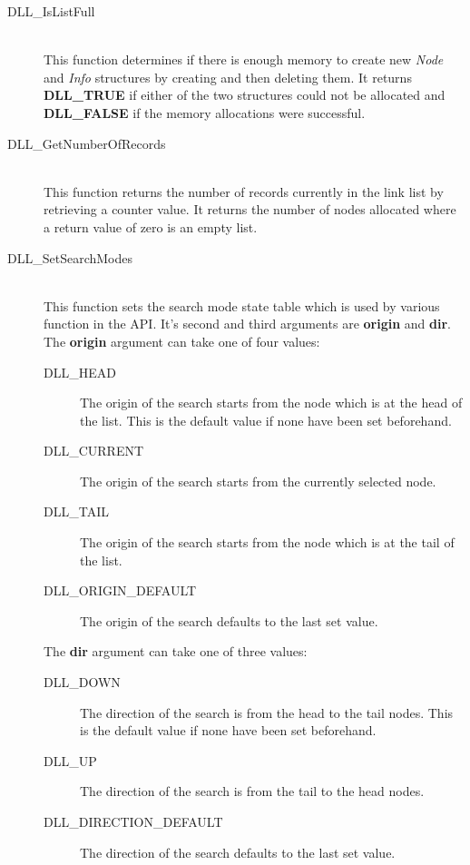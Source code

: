 \documentclass[10pt,letterpaper,titlepage]{article}
\begin{document}
\begin{description}
\begin{description}
 \item[DLL\_IsListFull]\quad\\
 This function determines if there is enough memory to create new \emph{Node} and \emph{Info} structures by creating and then deleting them.  It returns \textbf{DLL\_TRUE} if either of the two structures could not be allocated and \textbf{DLL\_FALSE} if the memory allocations were successful.

 \item[DLL\_GetNumberOfRecords]\quad\\
 This function returns the number of records currently in the link list by retrieving a counter value.  It returns the number of nodes allocated where a return value of zero is an empty list.

 \item[DLL\_SetSearchModes]\quad\\
 This function sets the search mode state table which is used by various function in the API.  It's second and third arguments are \textbf{origin} and \textbf{dir}.  The \textbf{origin} argument can take one of four values:

  \begin{description}
  \item[DLL\_HEAD] The origin of the search starts from the node which is at the head of the list.  This is the default value if none have been set beforehand.
  \item[DLL\_CURRENT] The origin of the search starts from the currently selected node.
  \item[DLL\_TAIL] The origin of the search starts from the node which is at the tail of the list.
  \item[DLL\_ORIGIN\_DEFAULT] The origin of the search defaults to the last set value.
  \end{description}

 The \textbf{dir} argument can take one of three values:

  \begin{description}
  \item[DLL\_DOWN] The direction of the search is from the head to the tail nodes.  This is the default value if none have been set beforehand.
  \item[DLL\_UP] The direction of the search is from the tail to the head nodes.
  \item[DLL\_DIRECTION\_DEFAULT] The direction of the search defaults to the last set value.
  \end{description}


\end{description}
\end{description}
\end{document}
